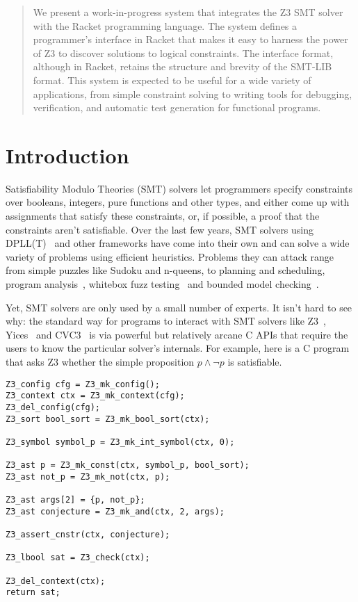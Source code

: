 \begin{abstract}
 We present a work-in-progress system that integrates the Z3 SMT solver with the
 Racket programming language. The system defines a programmer's interface in
 Racket that makes it easy to harness the power of Z3 to discover solutions to
 logical constraints. The interface format, although in Racket, retains the
 structure and brevity of the SMT-LIB format. This system is expected to be
 useful for a wide variety of applications, from simple constraint solving to
 writing tools for debugging, verification, and automatic test generation for
 functional programs.
\end{abstract}

\section{Introduction}
\label{sec:motiv}

Satisfiability Modulo Theories (SMT) solvers let programmers specify constraints
over booleans, integers, pure functions and other types, and either come up
with assignments that satisfy these constraints, or, if possible, a proof that
the constraints aren't satisfiable. Over the last few years, SMT solvers using
DPLL(T)~\cite{dpllt:04} and other frameworks have come into their own and can
solve a wide variety of problems using efficient heuristics. Problems they can
attack range from simple puzzles like Sudoku and n-queens, to planning and
scheduling, program analysis~\cite{Gulwani:08}, whitebox fuzz
testing~\cite{Godefroid:08} and bounded model checking~\cite{Armando:09}.

Yet, SMT solvers are only used by a small number of experts. It isn't hard to
see why: the standard way for programs to interact with SMT solvers like
Z3~\cite{z3}, Yices~\cite{yices} and CVC3~\cite{cvc3} is via powerful but
relatively arcane C APIs that require the users to know the particular solver's
internals. For example, here is a C program that asks Z3 whether the simple
proposition $p \wedge \neg p$ is satisfiable.

\begin{verbatim}
Z3_config cfg = Z3_mk_config();
Z3_context ctx = Z3_mk_context(cfg);
Z3_del_config(cfg);
Z3_sort bool_sort = Z3_mk_bool_sort(ctx);

Z3_symbol symbol_p = Z3_mk_int_symbol(ctx, 0);

Z3_ast p = Z3_mk_const(ctx, symbol_p, bool_sort);
Z3_ast not_p = Z3_mk_not(ctx, p);

Z3_ast args[2] = {p, not_p};
Z3_ast conjecture = Z3_mk_and(ctx, 2, args);

Z3_assert_cnstr(ctx, conjecture);

Z3_lbool sat = Z3_check(ctx);

Z3_del_context(ctx);
return sat;
\end{verbatim}


